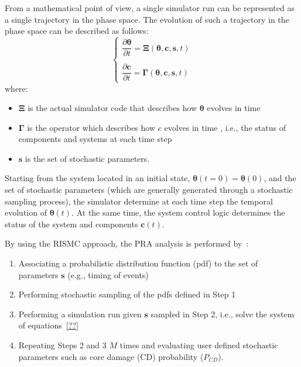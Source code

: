 From a mathematical point of view, a single simulator run can be represented as a single trajectory in the 
phase space. The evolution of such a trajectory in the phase space can be described as follows:
\begin{equation}
  \begin{cases}
    \dfrac{\partial \boldsymbol \theta }{\partial t}  = \boldsymbol \Xi (\boldsymbol \theta , \boldsymbol c, \boldsymbol s , t)   \\ \\ 
    \dfrac{\partial \boldsymbol c }{\partial t}  = \boldsymbol \Gamma (\boldsymbol \theta , \boldsymbol c, \boldsymbol s , t) 
  \end{cases}    
  \label{eq:trajectory}
\end{equation}
where:
\begin{itemize}
  \item $\boldsymbol \Xi$ is the actual simulator code that describes how $\boldsymbol \theta$ evolves in time
  \item $\boldsymbol \Gamma$ is the operator which describes how $c$ evolves in time , i.e., the status 
        of components and systems at each time step
  \item $\boldsymbol s$ is the set of stochastic parameters. 
\end{itemize}

Starting from the system located in an initial state, $\boldsymbol \theta (t=0) = \boldsymbol \theta(0)$, 
and the set of stochastic parameters (which are generally generated through a stochastic sampling process), 
the simulator determine at each 
time step the temporal evolution of $\boldsymbol \theta (t)$. At the same time, the system control logic  
determines the status of the system and components $\boldsymbol c(t)$.
 
By using the RISMC approach, the PRA analysis is performed by~\cite{}:
\begin{enumerate}
  \item Associating a probabilistic distribution function (pdf) to the set of parameters 
        $\boldsymbol s$ (e.g., timing of events)
  \item Performing stochastic sampling of the pdfs defined in Step 1
  \item Performing a simulation run given $\boldsymbol s$ sampled in Step 2, i.e., solve the 
        system of equations~\ref{??}
  \item Repeating Steps 2 and 3 $M$ times and evaluating user defined stochastic parameters such 
        as core damage (CD) probability ($P_{CD}$).
\end{enumerate}


